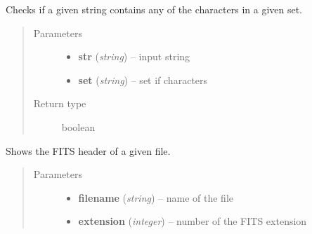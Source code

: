 \documentclass[letterpaper,10pt,english]{sphinxmanual}
\begin{document}

\begin{fulllineitems}
\label{SamPy.fits:SamPy.fits.ShowHeader.containsAny}
Checks if a given string contains any of the characters in a given set.
\begin{quote}\begin{description}
\item[{Parameters}] \leavevmode\begin{itemize}
\item {} 
\textbf{str} (\emph{string}) -- input string

\item {} 
\textbf{set} (\emph{string}) -- set if characters

\end{itemize}

\item[{Return type}] \leavevmode
boolean

\end{description}\end{quote}

\end{fulllineitems}



\begin{fulllineitems}
\label{SamPy.fits:SamPy.fits.ShowHeader.showHeader}
Shows the FITS header of a given file.
\begin{quote}\begin{description}
\item[{Parameters}] \leavevmode\begin{itemize}
\item {} 
\textbf{filename} (\emph{string}) -- name of the file

\item {} 
\textbf{extension} (\emph{integer}) -- number of the FITS extension

\end{itemize}

\end{description}\end{quote}

\end{fulllineitems}
\end{document}
